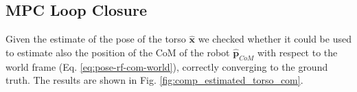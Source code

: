 \documentclass[a4paper]{article}
\begin{document}

\subsection{MPC Loop Closure}
Given the estimate of the pose of the torso $\bm{\hat{x}}$ we checked whether it
could be used to estimate also the position of the CoM of the robot
$\bm{\hat{p}}_{CoM}$ with respect to the world frame (Eq.
\ref{eq:pose-rf-com-world}), correctly converging to the ground truth.
The results are shown in Fig.
\ref{fig:comp_estimated_torso_com}.
\end{document}
